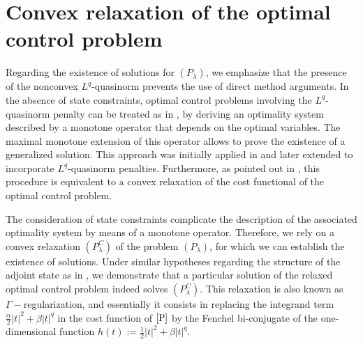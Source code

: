 \documentclass[11pt,a4paper]{amsart}
\newcommand{\om}{\Omega}
\begin{document}
\section{Convex relaxation of the optimal control problem}

Regarding the existence of solutions for $(P_\lambda)$, we emphasize that the presence of the nonconvex $L^q$-quasinorm prevents the use of direct method arguments. In the absence of state constraints, optimal control problems involving the $L^q$-quasinorm penalty can be treated as in \cite{ref1}, by deriving an optimality system described by a monotone operator that depends on the optimal variables. The maximal monotone extension of this operator allows to prove the existence of a generalized solution. This approach was initially applied in \cite{ref2} and later extended to incorporate $L^q$-quasinorm penalties. Furthermore, as pointed out in \cite{ref1}, this procedure is equivalent to a convex relaxation of the cost functional of the optimal control problem.

The consideration of state constraints complicate the description of the associated optimality system by means of a monotone operator. Therefore, we rely on a convex relaxation $(P^C_\lambda)$ of the problem $(P_\lambda)$, for which we can establish the existence of solutions. Under similar hypotheses regarding the structure of the adjoint state as in \cite{ref3}, we demonstrate that a particular solution of the relaxed optimal control problem indeed solves $(P^C_\lambda)$. This relaxation is also known as $\Gamma-$regularization, and essentially it consists in replacing the integrand term $\frac{\alpha}{2}|t|^2+\beta |t|^q$ in the cost function of $\eqref{P}$ by the Fenchel bi-conjugate of the one-dimensional function $h(t):=\frac{1}{2}|t|^2+\beta|t|^q$.

\end{document}
